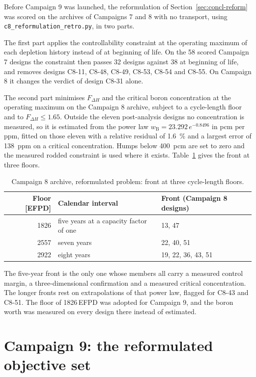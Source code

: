Before Campaign 9 was launched, the reformulation of
Section~\ref{sec:concl-reform} was scored on the archives of
Campaigns 7 and 8 with no transport, using
\texttt{c8\_reformulation\_retro.py}, in two parts.

The first part applies the controllability constraint at the operating maximum of
each depletion history instead of at beginning of life. On the 58
scored Campaign 7 designs the constraint then passes 32 designs against 38
at beginning of life, and removes designs C8-11, C8-48, C8-49, C8-53, C8-54 and C8-55. On
Campaign 8 it changes the verdict of design C8-31 alone.

The second part minimises $F_{\Delta H}$ and the critical boron
concentration at the operating maximum on the Campaign 8 archive,
subject to a cycle-length floor and to $F_{\Delta H} \le 1.65$. Outside
the eleven post-analysis designs no concentration is measured, so it is
estimated from the power law
$w_\mathrm{B} = 23.292\,e^{-0.8496}$ in pcm per ppm, fitted on those
eleven with a relative residual of \SI{1.6}{\%} and a largest error of
\SI{138}{ppm} on a critical concentration. Humps below \SI{400}{pcm}
are set to zero and the measured rodded constraint is used where it exists.
Table~\ref{tab:c8-retro} gives the front at three floors.

\begin{table}[htbp]
  \centering
  \small
  \caption{Campaign 8 archive, reformulated problem: front at three cycle-length floors.}
  \label{tab:c8-retro}
  \begin{tabular}{@{}rll@{}}
    \toprule
    Floor [EFPD] & Calendar interval & Front (Campaign 8 designs) \\
    \midrule
    1826 & five years at a capacity factor of one & 13, 47 \\
    2557 & seven years & 22, 40, 51 \\
    2922 & eight years & 19, 22, 36, 43, 51 \\
    \bottomrule
  \end{tabular}
\end{table}

The five-year front is the only one whose members all carry a measured
control margin, a three-dimensional confirmation and a measured
critical concentration. The longer fronts rest on extrapolations of that power law, flagged
for C8-43 and C8-51. The floor
of 1826\,EFPD was adopted for Campaign 9, and the boron worth was
measured on every design there instead of estimated.


\section{Campaign 9: the reformulated objective set}
\label{sec:res-c9}

